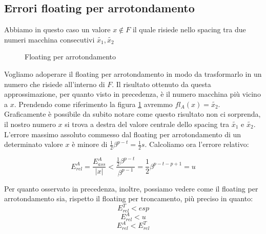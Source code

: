 \documentclass[12pt, a4paper]{book}
\theoremstyle{definition}
\begin{document}
\subsection{Errori floating per arrotondamento}
\begin{flushleft}
Abbiamo in questo caso un valore $x \notin F$  il quale risiede nello spacing tra due numeri macchina consecutivi $\widetilde{x_{1}},\widetilde{x_{2}}$


\begin{figure}[h!]
\centering
{}
\caption{Floating per arrotondamento}
\label{floating arrotondamento}
\end{figure}
Vogliamo adoperare il floating per arrotondamento in modo da trasformarlo in un numero che risiede all'interno di $F$. 
Il risultato ottenuto da questa approssimazione, per quanto visto in precedenza, è il numero macchina più vicino a $x$. 
Prendendo come riferimento la figura \ref{floating arrotondamento} avremmo $fl_{A}(x) = \widetilde{x_{2}}$.
Graficamente è possibile da subito notare come questo risultato non ci sorprenda, il nostro numero $x$ si trova a destra del valore centrale dello spacing tra $\widetilde{x_{1}}$ e $\widetilde{x_{2}}$.  L'errore massimo assoluto commesso dal floating per arrotondamento di un determinato valore $x$ è minore di $\frac{1}{2}\beta^{p-t} = \frac{1}{2}s$. 
Calcoliamo ora l'errore relativo: 

\[ E_{rel}^{A} = \frac{E_{ass}^{A}}{|x|} < \frac{\frac{1}{2}\beta^{p-t}}{\beta^{p-1}} = \frac{1}{2}\beta^{p-t-p+1} = u \]

Per quanto osservato in precedenza, inoltre, possiamo vedere come il floating per arrotondamento sia, rispetto il floating per 
troncamento,  più preciso in quanto: 
\[ E_{rel}^{T} < esp \]
\[ E_{rel}^{A} < u \]
\[ E_{rel}^{A} < E_{rel}^{T}  \]
\end{flushleft}
\end{document}
